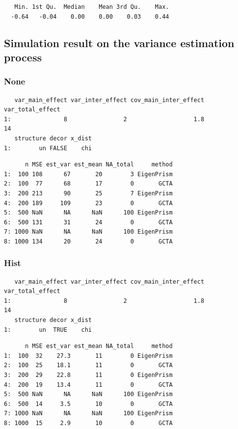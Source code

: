 \documentclass[]{article}
\begin{document}
\begin{verbatim}
   Min. 1st Qu.  Median    Mean 3rd Qu.    Max. 
  -0.64   -0.04    0.00    0.00    0.03    0.44 
\end{verbatim}

\subsection{Simulation result on the variance estimation
process}\label{simulation-result-on-the-variance-estimation-process}

\subsubsection{None}\label{none-2}

\begin{verbatim}
   var_main_effect var_inter_effect cov_main_inter_effect var_total_effect
1:               8                2                   1.8               14
   structure decor x_dist
1:        un FALSE    chi
\end{verbatim}

\begin{verbatim}
      n MSE est_var est_mean NA_total     method
1:  100 108      67       20        3 EigenPrism
2:  100  77      68       17        0       GCTA
3:  200 213      90       25        7 EigenPrism
4:  200 189     109       23        0       GCTA
5:  500 NaN      NA      NaN      100 EigenPrism
6:  500 131      31       24        0       GCTA
7: 1000 NaN      NA      NaN      100 EigenPrism
8: 1000 134      20       24        0       GCTA
\end{verbatim}

\subsubsection{Hist}\label{hist-2}

\begin{verbatim}
   var_main_effect var_inter_effect cov_main_inter_effect var_total_effect
1:               8                2                   1.8               14
   structure decor x_dist
1:        un  TRUE    chi
\end{verbatim}

\begin{verbatim}
      n MSE est_var est_mean NA_total     method
1:  100  32    27.3       11        0 EigenPrism
2:  100  25    18.1       11        0       GCTA
3:  200  29    22.8       11        0 EigenPrism
4:  200  19    13.4       11        0       GCTA
5:  500 NaN      NA      NaN      100 EigenPrism
6:  500  14     3.5       10        0       GCTA
7: 1000 NaN      NA      NaN      100 EigenPrism
8: 1000  15     2.9       10        0       GCTA
\end{verbatim}
\end{document}
